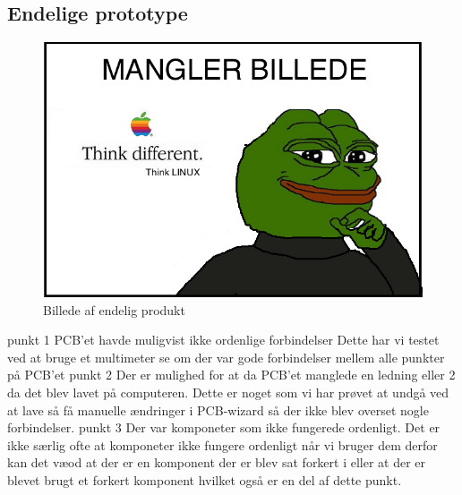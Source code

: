 \subsection{Endelige prototype}\label{subs:endeligProto}
\begin{figure}[H]
	\centering
    \includegraphics[width=13cm]{figures/stock.jpg}
	\caption{Billede af endelig produkt}
	\label{fig:endeligPrototype}
\end{figure}
punkt 1 PCB'et havde muligvist ikke ordenlige forbindelser
Dette har vi testet ved at bruge et multimeter se om der var gode forbindelser mellem alle punkter på PCB'et
punkt 2 Der er mulighed for at da PCB'et manglede en ledning eller 2 da det blev lavet på computeren.
Dette er noget som vi har prøvet at undgå ved at lave så få manuelle ændringer i PCB-wizard så der ikke blev overset nogle forbindelser. 
punkt 3 Der var komponeter som ikke fungerede ordenligt.
Det er ikke særlig ofte at komponeter ikke fungere ordenligt når vi bruger dem derfor kan det væod at der er en komponent der er blev sat forkert i eller at der er blevet brugt et forkert komponent hvilket også er en del af dette punkt.


